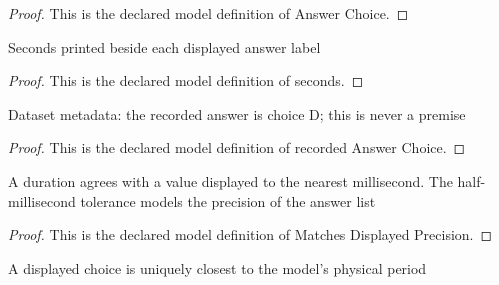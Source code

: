 \begin{proof}
  This is the declared model definition of Answer Choice.
\end{proof}
\begin{definition}[seconds]
  \label{def:physics:phyx-mini-0225:phyxminiproblems-problemphyxmini0225-answerchoice-seconds}
  Seconds printed beside each displayed answer label
\end{definition}
\begin{proof}
  This is the declared model definition of seconds.
\end{proof}
\begin{definition}
  \label{def:physics:phyx-mini-0225:phyxminiproblems-problemphyxmini0225-recordedanswerchoice}
  Dataset metadata: the recorded answer is choice D; this is never a premise
\end{definition}
\begin{proof}
  This is the declared model definition of recorded Answer Choice.
\end{proof}
\begin{definition}
  \label{def:physics:phyx-mini-0225:phyxminiproblems-problemphyxmini0225-matchesdisplayedprecision}
  A duration agrees with a value displayed to the nearest millisecond. The half-millisecond tolerance models the precision of the answer list
\end{definition}
\begin{proof}
  This is the declared model definition of Matches Displayed Precision.
\end{proof}
\begin{definition}
  \label{def:physics:phyx-mini-0225:phyxminiproblems-problemphyxmini0225-isuniqueclosestanswer}
  A displayed choice is uniquely closest to the model's physical period
\end{definition}
